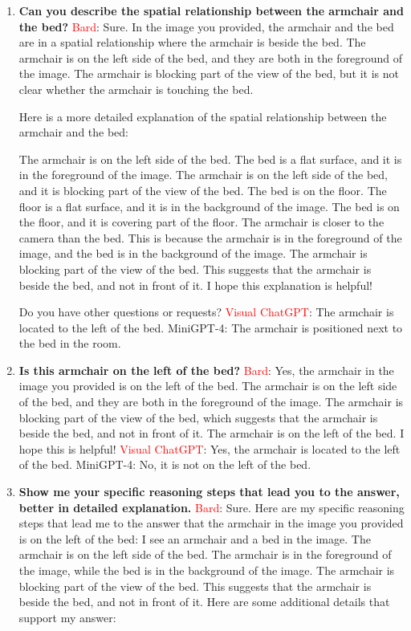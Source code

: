 \begin{enumerate}
    \item \textbf{Can you describe the spatial relationship between the armchair and the bed?}
    \subitem \textcolor{Red}{Bard}: 
    Sure. In the image you provided, the armchair and the bed are in a spatial relationship where the armchair is beside the bed. The armchair is on the left side of the bed, and they are both in the foreground of the image. The armchair is blocking part of the view of the bed, but it is not clear whether the armchair is touching the bed.
    
    Here is a more detailed explanation of the spatial relationship between the armchair and the bed:
    
    The armchair is on the left side of the bed. The bed is a flat surface, and it is in the foreground of the image. The armchair is on the left side of the bed, and it is blocking part of the view of the bed.
    The bed is on the floor. The floor is a flat surface, and it is in the background of the image. The bed is on the floor, and it is covering part of the floor.
    The armchair is closer to the camera than the bed. This is because the armchair is in the foreground of the image, and the bed is in the background of the image.
    The armchair is blocking part of the view of the bed. This suggests that the armchair is beside the bed, and not in front of it.
    I hope this explanation is helpful!
    
    Do you have other questions or requests?
    \subitem \textcolor{red}{Visual ChatGPT}: The armchair is located to the left of the bed.
    \subitem MiniGPT-4: The armchair is positioned next to the bed in the room.
    \item \textbf{Is this armchair on the left of the bed?}
    \subitem \textcolor{Red}{Bard}: 
    Yes, the armchair in the image you provided is on the left of the bed. The armchair is on the left side of the bed, and they are both in the foreground of the image. The armchair is blocking part of the view of the bed, which suggests that the armchair is beside the bed, and not in front of it. The armchair is on the left of the bed.
    I hope this is helpful!
    \subitem \textcolor{red}{Visual ChatGPT}: Yes, the armchair is located to the left of the bed.
    \subitem MiniGPT-4: No, it is not on the left of the bed.
    \item \textbf{Show me your specific reasoning steps that lead you to the answer, better in detailed explanation.}
    \subitem \textcolor{Red}{Bard}: 
    Sure. Here are my specific reasoning steps that lead me to the answer that the armchair in the image you provided is on the left of the bed:
    I see an armchair and a bed in the image.
    The armchair is on the left side of the bed.
    The armchair is in the foreground of the image, while the bed is in the background of the image.
    The armchair is blocking part of the view of the bed. This suggests that the armchair is beside the bed, and not in front of it.
    Here are some additional details that support my answer:


\end{enumerate}
